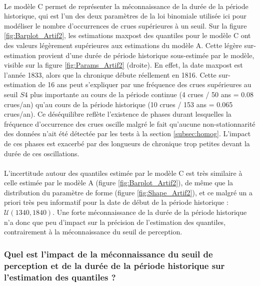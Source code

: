 \documentclass[11pt]{article}
\begin{document}
	\paragraph{} Le modèle C permet de représenter la méconnaissance de la durée de la période historique, qui est l'un des deux paramètres de la loi binomiale utilisée ici pour modéliser le nombre d'occurrences de crues supérieures à un seuil. Sur la figure \ref{fig:Barplot_Artif2}, les estimations maxpost des quantiles pour le modèle C ont des valeurs légèrement supérieures aux estimations du modèle A. Cette légère sur-estimation provient d'une durée de période historique sous-estimée par le modèle, visible sur la figure \ref{fig:Params_Artif2} (droite). En effet, la date maxpost est l'année 1833, alors que la chronique débute réellement en 1816. Cette sur-estimation de 16 ans peut s'expliquer par une fréquence des crues supérieures au seuil $S4$ plus importante au cours de la période continue (4 crues / 50 ans = 0.08 crues/an) qu'au cours de la période historique (10 crues / 153 ans = 0.065 crues/an). Ce déséquilibre reflète l'existence de phases durant lesquelles la fréquence d'occurrence des crues oscille malgré le fait qu'aucune non-stationnarité des données n'ait été détectée par les tests à la section \ref{subsec:homog}. L'impact de ces phases est exacerbé par des longueurs de chronique trop petites devant la durée de ces oscillations. 
	\paragraph{} L'incertitude autour des quantiles estimée par le modèle C est très similaire à celle estimée par le modèle A (figure \ref{fig:Barplot_Artif2}), de même que la distribution du paramètre de forme (figure \ref{fig:Shape_Artif2}), et ce malgré un a priori très peu informatif pour la date de début de la période historique : $\mathcal{U}(1340,1840)$. Une forte méconnaissance de la durée de la période historique n'a donc que peu d'impact sur la précision de l'estimation des quantiles, contrairement à la méconnaissance du seuil de perception.
	
	\subsubsection{Quel est l'impact de la méconnaissance du seuil de perception et de la durée de la période historique sur l'estimation des quantiles ?}	
	
\end{document}
